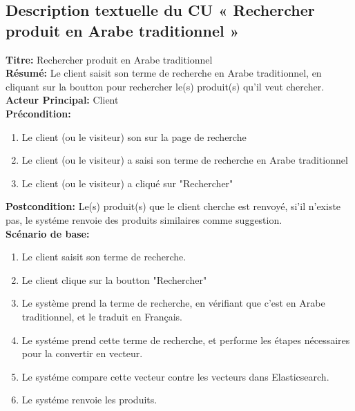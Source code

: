 \subsection{Description textuelle du CU « Rechercher produit en Arabe traditionnel »}
\noindent
\textbf{Titre:} Rechercher produit en Arabe traditionnel \\
\textbf{Résumé:} Le client saisit son terme de recherche en Arabe traditionnel, en cliquant sur la boutton pour rechercher le(s) produit(s) qu'il veut chercher. \\
\textbf{Acteur Principal:} Client \\
\textbf{Précondition:} \begin{enumerate}
	\item Le client (ou le visiteur) son sur la page de recherche
	\item Le client (ou le visiteur) a saisi son terme de recherche en Arabe traditionnel
	\item Le client (ou le visiteur) a cliqué sur "Rechercher"
\end{enumerate}
\textbf{Postcondition:} Le(s) produit(s) que le client cherche est renvoyé, si'il n'existe pas, le systéme renvoie des produits similaires comme suggestion. \\
\textbf{Scénario de base: }
\begin{enumerate}
	\item Le client saisit son terme de recherche.
	\item Le client clique sur la boutton "Rechercher"
	\item Le système prend la terme de recherche, en vérifiant que c'est en Arabe traditionnel, et le traduit en Français.
	\item Le systéme prend cette terme de recherche, et performe les étapes nécessaires pour la convertir en vecteur.
	\item Le systéme compare cette vecteur contre les vecteurs dans Elasticsearch.
	\item Le systéme renvoie les produits.
\end{enumerate}

